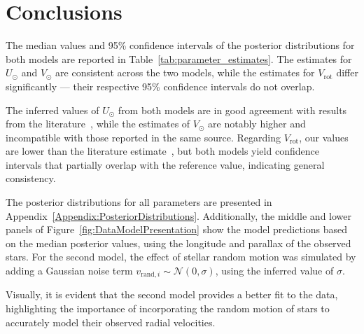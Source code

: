 \section{Conclusions}

The median values and 95\% confidence intervals of the posterior distributions for both models are reported in Table~\ref{tab:parameter_estimates}. The estimates for $U_\odot$ and $V_\odot$ are consistent across the two models, while the estimates for $V_{\text{rot}}$ differ significantly — their respective 95\% confidence intervals do not overlap.

The inferred values of $U_\odot$ from both models are in good agreement with results from the literature~\cite{LocalKinematics}, while the estimates of $V_\odot$ are notably higher and incompatible with those reported in the same source. Regarding $V_{\text{rot}}$, our values are lower than the literature estimate~\cite{GalacticKinematics}, but both models yield confidence intervals that partially overlap with the reference value, indicating general consistency.

The posterior distributions for all parameters are presented in Appendix~\ref{Appendix:PosteriorDistributions}. Additionally, the middle and lower panels of Figure~\ref{fig:DataModelPresentation} show the model predictions based on the median posterior values, using the longitude and parallax of the observed stars. For the second model, the effect of stellar random motion was simulated by adding a Gaussian noise term $v_{\text{rand}, i} \sim \mathcal{N}(0, \sigma)$, using the inferred value of $\sigma$.

Visually, it is evident that the second model provides a better fit to the data, highlighting the importance of incorporating the random motion of stars to accurately model their observed radial velocities.

